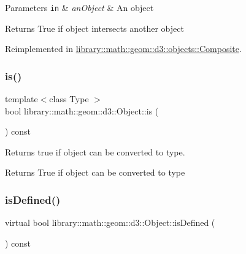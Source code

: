 \begin{DoxyParams}[1]{Parameters}
\mbox{\tt in}  & {\em an\+Object} & An object \\
\hline
\end{DoxyParams}
\begin{DoxyReturn}{Returns}
True if object intersects another object 
\end{DoxyReturn}


Reimplemented in \hyperlink{classlibrary_1_1math_1_1geom_1_1d3_1_1objects_1_1_composite_abd37bc6f0b9132cee832d1628b76269c}{library\+::math\+::geom\+::d3\+::objects\+::\+Composite}.

\mbox{\label{classlibrary_1_1math_1_1geom_1_1d3_1_1_object_a72d75450e5158f602f0847f082606603}} 
\subsubsection{\texorpdfstring{is()}{is()}}
{\footnotesize\ttfamily template$<$class Type $>$ \\
bool library\+::math\+::geom\+::d3\+::\+Object\+::is (\begin{DoxyParamCaption}{ }\end{DoxyParamCaption}) const\hspace{0.3cm}{\ttfamily [inline]}}



Returns true if object can be converted to type. 

\begin{DoxyReturn}{Returns}
True if object can be converted to type 
\end{DoxyReturn}
\mbox{\label{classlibrary_1_1math_1_1geom_1_1d3_1_1_object_a2216442e322f0c3ca5f01a4efa22baf7}} 
\subsubsection{\texorpdfstring{is\+Defined()}{isDefined()}}
{\footnotesize\ttfamily virtual bool library\+::math\+::geom\+::d3\+::\+Object\+::is\+Defined (\begin{DoxyParamCaption}{ }\end{DoxyParamCaption}) const\hspace{0.3cm}{\ttfamily [pure virtual]}}



